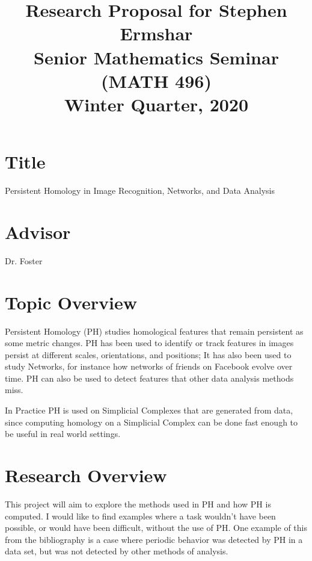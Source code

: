 \documentclass{article}
\title{
    \LARGE
    Research Proposal for Stephen Ermshar\\
    \large
    Senior Mathematics Seminar (MATH 496)\\
    Winter Quarter, 2020}
\author{}
\date{}
\begin{document}
\maketitle

\section*{Title}\vspace{-1em}

Persistent Homology in Image Recognition, Networks, and Data Analysis

\section*{Advisor}\vspace{-1em}

Dr. Foster

\section*{Topic Overview}\vspace{-1em}

Persistent Homology (PH) studies homological features that remain persistent as some metric changes. PH has been used to identify or track features in images persist at different scales, orientations, and positions; It has also been used to study Networks, for instance how networks of friends on Facebook evolve over time. PH can also be used to detect features that other data analysis methods miss.

In Practice PH is used on Simplicial Complexes that are generated from data, since computing homology on a Simplicial Complex can be done fast enough to be useful in real world settings.

\section*{Research Overview}\vspace{-1em}
This project will aim to explore the methods used in PH and how PH is computed. I would like to find examples where a task wouldn't have been possible, or would have been difficult, without the use of PH. One example of this from the bibliography is a case where periodic behavior was detected by PH in a data set, but was not detected by other methods of analysis.
\newpage

\nocite{aktas}
\nocite{carlsson}
\nocite{koplik}
\nocite{josea.pereaa}
\nocite{yang}
\nocite{ghrist}
\nocite{wagner}

\renewcommand\refname{Bibliography}

\end{document}
